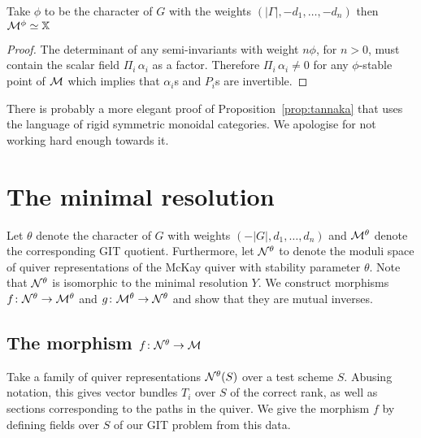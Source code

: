\documentclass{amsart}
\theoremstyle{definition}
\begin{document}


\begin{corollary}
Take $\phi$ to be the character of $G$ with the weights $(|\Gamma|, -d_1,\ldots, -d_n)$ then $\mathcal{M}^\phi \simeq \mathbb{X}$
\end{corollary}

\begin{proof}
The determinant of any semi-invariants with weight $n \phi$, for $n>0$, must contain the scalar field $\Pi_i \, \alpha_i$ as a factor.
Therefore $\Pi_i \, \alpha_i \neq 0$ for any $\phi$-stable point of $\mathcal{M}$ which implies that $\alpha_i$s and $P_i$s are invertible.
\end{proof}

\begin{remark}
There is probably a more elegant proof of Proposition~\ref{prop:tannaka} that uses the language of rigid symmetric monoidal categories.
We apologise for not working hard enough towards it.
\end{remark}

\section{The minimal resolution}

Let $\theta$ denote the character of $G$ with weights $(-|G|,d_1,\ldots,d_n)$ and $\mathcal{M}^\theta$ denote the corresponding GIT quotient.
Furthermore, let $\mathcal{N}^\theta$ to denote the moduli space of quiver representations of the McKay quiver with stability parameter $\theta$.
Note that $\mathcal{N}^\theta$ is isomorphic to the minimal resolution $Y$.
We construct morphisms $f \colon \mathcal{N}^\theta \rightarrow \mathcal{M}^\theta$ and $g \colon \mathcal{M}^\theta \rightarrow \mathcal{N}^\theta$ and show that they are mutual inverses.

\subsection{The morphism $f \colon \mathcal{N}^\theta \rightarrow \mathcal{M}$}

Take a family of quiver representations $\mathcal{N}^\theta(S)$ over a test scheme $S$.
Abusing notation, this gives vector bundles $T_i$ over $S$ of the correct rank, as well as sections corresponding to the paths in the quiver.
We give the morphism $f$ by defining fields over $S$ of our GIT problem from this data.
\end{document}
